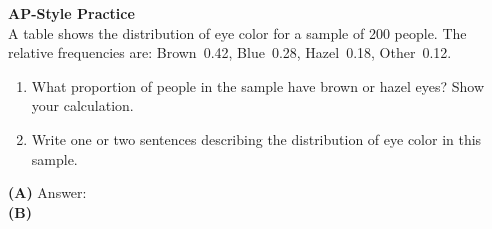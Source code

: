 \documentclass[10pt]{article}
\begin{document}
\begin{tcolorbox}[colback=redbg, colframe=redacc, boxrule=0.8pt, arc=2mm,
    left=4mm, right=4mm, top=3mm, bottom=3mm]
\small\textbf{AP-Style Practice}\\[6pt]
A table shows the distribution of eye color for a sample of 200 people.
The relative frequencies are: Brown~0.42, Blue~0.28, Hazel~0.18, Other~0.12.

\vspace{10pt}
\begin{enumerate}[label=\textbf{(\Alph*)}, leftmargin=2em, itemsep=6pt]
  \item What proportion of people in the sample have brown or hazel eyes?
        Show your calculation.
  \item Write one or two sentences describing the distribution of eye color
        in this sample.
\end{enumerate}

\vspace{10pt}
\textbf{(A)} Answer: \blank{6cm}\\[10pt]
\textbf{(B)} \writeline\\[1pt]\writeline

\end{tcolorbox}
\end{document}
